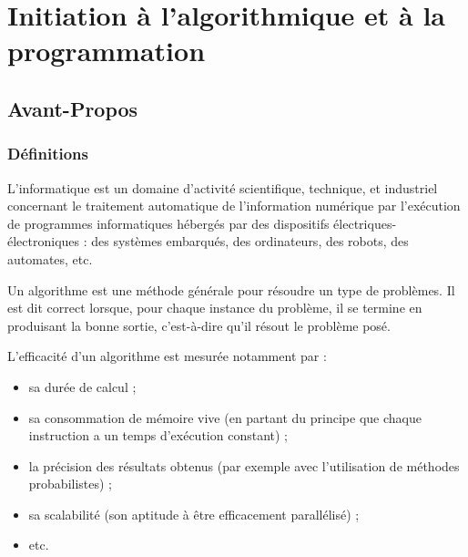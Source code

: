 \setchapterpreamble[u]{\margintoc}
\chapter{Initiation à l'algorithmique et à la programmation}


\section{Avant-Propos}
\subsection{Définitions}

\begin{defi}
L'informatique est un domaine d'activité scientifique, technique, et industriel concernant le traitement automatique de l'information numérique par l'exécution de programmes informatiques hébergés par des dispositifs électriques-électroniques : des systèmes embarqués, des ordinateurs, des robots, des automates, etc.
\end{defi}

\begin{defi}
Un algorithme est une méthode générale pour résoudre un type de problèmes. Il est dit correct lorsque, pour chaque instance du problème, il se termine en produisant la bonne sortie, c'est-à-dire qu'il résout le problème posé.
\end{defi}

L'efficacité d'un algorithme est mesurée notamment par :
\begin{itemize}
\item sa durée de calcul ;
\item sa consommation de mémoire vive (en partant du principe que chaque instruction a un temps d'exécution constant) ;
\item la précision des résultats obtenus (par exemple avec l'utilisation de méthodes probabilistes) ;
\item sa scalabilité (son aptitude à être efficacement parallélisé) ;
\item etc.
\end{itemize}

